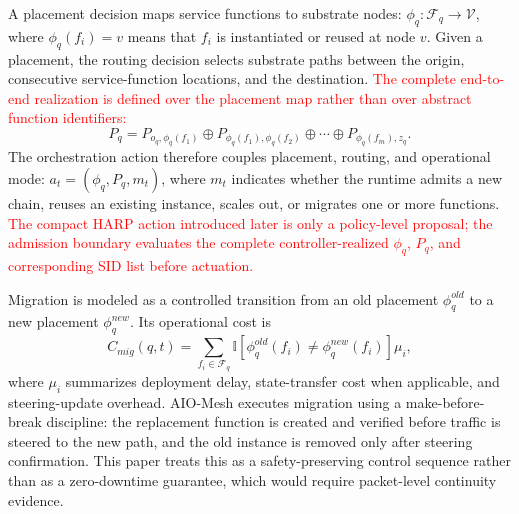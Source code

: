 \documentclass[final,5p]{elsarticle}
\newcommand{\rev}[1]{\textcolor{red}{#1}}
\newenvironment{revision}{\color{red}}{}
\begin{document}
A placement decision maps service functions to substrate nodes: $\phi_q:\mathcal{F}_q\rightarrow\mathcal{V}$,
where \(\phi_q(f_i)=v\) means that \(f_i\) is instantiated or reused at node \(v\). Given a placement, the routing decision selects substrate paths between the origin, consecutive service-function locations, and the destination. \rev{The complete end-to-end realization is defined over the placement map rather than over abstract function identifiers:}
\begin{revision}
\begin{equation}
P_q = P_{o_q,\phi_q(f_1)} \oplus P_{\phi_q(f_1),\phi_q(f_2)} \oplus \cdots \oplus P_{\phi_q(f_m),z_q}.
\label{eq:full_chain_path}
\end{equation}
\end{revision}
The orchestration action therefore couples placement, routing, and operational mode: $a_t = \left(\phi_q,P_q,m_t\right)$, where \(m_t\) indicates whether the runtime admits a new chain, reuses an existing instance, scales out, or migrates one or more functions. \rev{The compact HARP action introduced later is only a policy-level proposal; the admission boundary evaluates the complete controller-realized \(\phi_q\), \(P_q\), and corresponding SID list before actuation.}

Migration is modeled as a controlled transition from an old placement \(\phi_q^{old}\) to a new placement \(\phi_q^{new}\). Its operational cost is
\begin{equation}
    C_{mig}(q,t)=
    \sum_{f_i\in\mathcal{F}_q}
    \mathbb{I}\!\left[\phi_q^{old}(f_i)\neq \phi_q^{new}(f_i)\right]\mu_i,
\end{equation}
where \(\mu_i\) summarizes deployment delay, state-transfer cost when applicable, and steering-update overhead. AIO-Mesh executes migration using a make-before-break discipline: the replacement function is created and verified before traffic is steered to the new path, and the old instance is removed only after steering confirmation. This paper treats this as a safety-preserving control sequence rather than as a zero-downtime guarantee, which would require packet-level continuity evidence.
\end{document}
